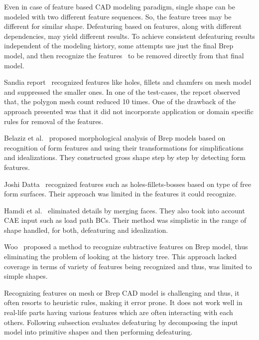 Even in case of feature based CAD modeling paradigm, single shape can be modeled with two different feature sequences. So, the feature trees may be different for similar shape. Defeaturing based on features, along with different dependencies, may yield different results. To achieve consistent defeaturing results independent of the modeling history, some attempts use just the final Brep model, and then recognize the features~\cite{Woo2009} to be removed directly from that final model.	

Sandia report~\cite{Watterberg1999} recognized features like holes, fillets and chamfers on mesh model and suppressed the smaller ones. In one of the test-cases, the report observed that, the polygon mesh count reduced 10 times. One of the drawback of the approach presented was that it did not incorporate application or domain specific rules for removal of the features.

Belaziz et al.~\cite{BelazizBourasBrun2000} proposed morphological analysis of Brep models based on recognition of form features and using their transformations for simplifications and idealizations. They constructed gross shape step by step by detecting form features. 

Joshi Datta~\cite{Joshi2003} recognized features such as holes-fillets-bosses based on type of free form surfaces. Their approach was limited in the features it could recognize.

Hamdi et al.~\cite{Hamdi2005, Hamdi2007, Hamdi2009, Hamdi2010, Hamdi2012, Hamdi2012a} eliminated details by merging faces. They also took into account CAE input such as load path BCs. Their method was simplistic in the range of shape handled, for both, defeaturing and idealization.

Woo~\cite{Woo2009} proposed a method to recognize subtractive features on Brep model, thus eliminating the problem of looking at the history tree. This approach lacked coverage in terms of variety of features being recognized and thus, was limited to simple shapes.

Recognizing features on mesh or Brep CAD model is challenging and thus, it often resorts to heuristic rules, making it error prone. It does not work well in real-life parts having various features which are often interacting with each others. Following subsection evaluates defeaturing by decomposing the input model into primitive shapes and then performing defeaturing.

